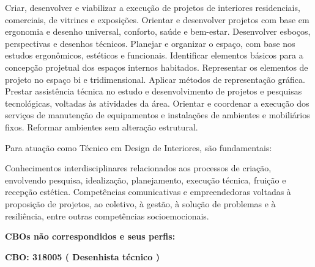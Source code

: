 \documentclass[
]{article}
\begin{document}
Criar, desenvolver e viabilizar a execução de projetos de interiores
residenciais, comerciais, de vitrines e exposições. Orientar e
desenvolver projetos com base em ergonomia e desenho universal,
conforto, saúde e bem-estar. Desenvolver esboços, perspectivas e
desenhos técnicos. Planejar e organizar o espaço, com base nos estudos
ergonômicos, estéticos e funcionais. Identificar elementos básicos para
a concepção projetual dos espaços internos habitados. Representar os
elementos de projeto no espaço bi e tridimensional. Aplicar métodos de
representação gráfica. Prestar assistência técnica no estudo e
desenvolvimento de projetos e pesquisas tecnológicas, voltadas às
atividades da área. Orientar e coordenar a execução dos serviços de
manutenção de equipamentos e instalações de ambientes e mobiliários
fixos. Reformar ambientes sem alteração estrutural.

Para atuação como Técnico em Design de Interiores, são fundamentais:

Conhecimentos interdisciplinares relacionados aos processos de criação,
envolvendo pesquisa, idealização, planejamento, execução técnica,
fruição e recepção estética. Competências comunicativas e empreendedoras
voltadas à proposição de projetos, ao coletivo, à gestão, à solução de
problemas e à resiliência, entre outras competências socioemocionais.

\textbf{CBOs não correspondidos e seus perfis:}

\textbf{CBO: 318005  ( Desenhista técnico )}
\end{document}
